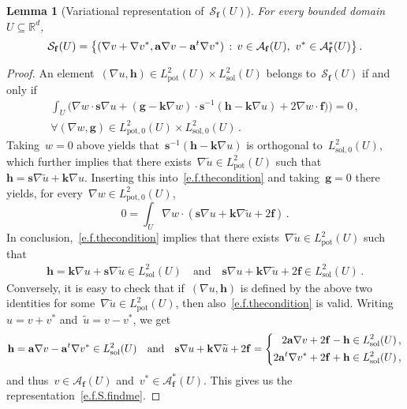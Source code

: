 \documentclass[11pt,twoside]{article} %
\numberwithin{equation}{section}
\newtheorem{lemma}[theorem]{Lemma}
\theoremstyle{definition}
\let\originalleft\left
\let\originalright\right
\renewcommand{\left}{\mathopen{}\mathclose\bgroup\originalleft}
\renewcommand{\right}{\aftergroup\egroup\originalright}
\newcommand*{\Rd}{\ensuremath{\mathbb{R}^d}}
\renewcommand*{\tilde}{\widetilde}
\newcommand{\qand}{\quad \mbox{and} \quad }
\newcommand{\f}{\mathbf{f}}
\newcommand{\s}{\mathbf{s}}
\renewcommand{\a}{\mathbf{a}}
\renewcommand{\k}{\mathbf{k}}
\renewcommand{\S}{\mathcal{S}}
\newcommand{\A}{\mathcal{A}}
\newcommand{\Lsol}{L^2_{\mathrm{sol}}}
\newcommand{\Lsolo}{L^2_{\mathrm{sol,0}}}
\newcommand{\Lpot}{L^2_{\mathrm{pot}}}
\newcommand{\Lpoto}{L^2_{\mathrm{pot,0}}}
\begin{document}
\begin{lemma}[Variational representation of~$\mathcal{S}_{\f}(U)$]
\label{l.f.S.findme}
For every bounded domain~$U\subseteq\Rd$,
\begin{equation}
\label{e.f.S.findme}
\S_{\f}(U)
=
\left\{ (\nabla v+\nabla v^*, \a\nabla v - \a^t\nabla v^*) \,:\, v\in \A_{\f}(U), \ v^*\in \A_{\f}^*(U)
\right\}
\,.
\end{equation}
\end{lemma}
\begin{proof}
An element~$(\nabla u,\mathbf{h}) \in \Lpot(U)\times\Lsol(U)$ belongs to~$\S_{\f}(U)$ if and only if 
\begin{multline}
\label{e.f.thecondition}
\int_U \bigl(
\nabla w \cdot \s \nabla u + (\mathbf{g} -\k\nabla w) 
\cdot \s^{-1} (\mathbf{h} - \k \nabla u )
+  2 \nabla w \cdot \f )
\bigr) = 0\,, 
\\
\forall (\nabla w,\mathbf{g}) \in \Lpoto(U) \times \Lsolo(U)\,.
\end{multline}
Taking~$w=0$ above yields that~$\s^{-1}(\mathbf{h}-\k \nabla u)$ is orthogonal to~$\Lsolo(U)$, which further implies that there exists~$\nabla \tilde u \in \Lpot(U)$ such that~$\mathbf{h} = \s \nabla \tilde u + \k \nabla u$. Inserting this into~\eqref{e.f.thecondition} and taking~$\mathbf{g}= 0$ there yields, for every~$\nabla w\in \Lpoto(U)$,  
\begin{equation*}
0 
=
\int_U 
\nabla w \cdot ( \s \nabla u +  \k\nabla \tilde u + 2\f )\,.
\end{equation*}
In conclusion,~\eqref{e.f.thecondition} implies that there exists~$\nabla \tilde u \in \Lpot(U)$ such that
\begin{align*}  
\mathbf{h}  = \k\nabla u + \s \nabla \tilde u \in \Lsol(U)
\qand 
\s \nabla u +  \k\nabla \tilde u  + 2\f \in \Lsol(U)
\,.
\end{align*}
Conversely, it is easy to check that if~$(\nabla u, \mathbf{h})$ is defined by the above two identities for some~$\nabla \tilde u \in \Lpot(U)$, then also~\eqref{e.f.thecondition} is valid. Writing~$u = v + v^*$ and~$\tilde u =  v - v^*$, 
we get
\begin{equation*}
\mathbf{h} = \a\nabla v - \a^t \nabla v^*  \in \Lsol(U) 
\qand
\s \nabla u +  \k\nabla \tilde u  + 2\f 
= 
\left\{ 
\begin{aligned}
2\a \nabla v + 2\f - \mathbf{h} \in \Lsol(U) \, , \\
2\a^t \nabla v^* + 2\f + \mathbf{h} \in \Lsol(U)  \,,
\end{aligned}
\right.
\end{equation*}
and thus~$v  \in\A_{\f}(U)$ and~$v^* \in\A_{\f}^*(U)$. This gives us the representation~\eqref{e.f.S.findme}. 
\end{proof}
\end{document}
